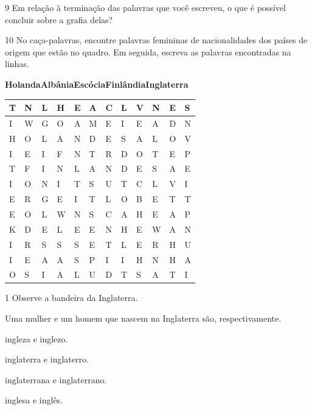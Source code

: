 \num{9} Em relação à terminação das palavras que você escreveu, o que é possível
concluir sobre a grafia delas?


\num{10} No caça-palavras, encontre palavras femininas de nacionalidades dos
países de origem que estão no quadro. Em seguida, escreva as palavras
encontradas na linhas.

\begin{mdframed}[linewidth=2pt,linecolor=salmao,roundcorner=20pt]
\textbf{Holanda}\hfill \textbf{Albânia}\hfill \textbf{Escócia}\hfill \textbf{Finlândia}\hfill \textbf{Inglaterra}
\end{mdframed}

\begin{longtable}[]{@{}llllllllllll@{}}
\toprule
T & N & L & H & E & A & C & L & V & N & E & S\tabularnewline
\midrule
\endhead
I & W & G & O & A & M & E & I & E & A & D & N\tabularnewline
H & O & L & A & N & D & E & S & A & L & O & V\tabularnewline
I & E & I & F & N & T & R & D & O & T & E & P\tabularnewline
T & F & I & N & L & A & N & D & E & S & A & E\tabularnewline
I & O & N & I & T & S & U & T & C & L & V & I\tabularnewline
E & R & G & E & I & T & L & O & B & E & T & T\tabularnewline
E & O & L & W & N & S & C & A & H & E & A & P\tabularnewline
K & D & E & L & E & E & N & H & E & W & A & N\tabularnewline
I & R & S & S & S & E & T & L & E & R & H & U\tabularnewline
I & E & A & A & S & P & I & I & H & N & H & A\tabularnewline
O & S & I & A & L & U & D & T & S & A & T & I\tabularnewline
\bottomrule
\end{longtable}



\num{1} Observe a bandeira da Inglaterra. %



Uma mulher e um homem que nascem na Inglaterra são, respectivamente.

\begin{escolha}
\item ingleza e inglezo.

\item inglaterra e inglaterro.

\item inglaterrana e inglaterrano.

\item inglesa e inglês.
\end{escolha}

